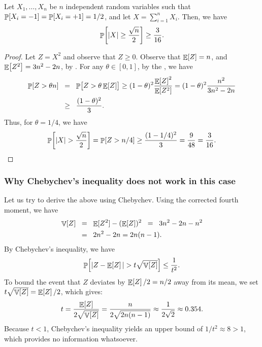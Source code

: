 \begin{lemma}
    Let $X_1, \ldots, X_n$ be $n$ independent random variables such
    that $\Prob{X_i=-1} = \Prob{X_i =+1} = 1/2$, and let
    $X = \sum_{i=1}^n X_i$. Then, we have
    \begin{align*}
      \Prob{\cardin{X} \geq \frac{\sqrt{n}}{2}}
      \geq%
      \frac{3}{16}.
    \end{align*}
\end{lemma}
\begin{proof}
    Let $Z = X^2$ and observe that $Z \geq 0$. Observe that
    $\mathop{\mathbb{E}}\!\left[ {Z} \right] = n$, and $\mathop{\mathbb{E}}\!\left[ {Z^2} \right] = 3n^2 - 2n$, by
    . For any $\theta \in [0,1]$, by
    the , we have
    \begin{align*}
        \Prob{ Z > \theta n}
        &\EQ%
        \Prob{Z > \theta \Ex{Z}\bigr.}
        \geq%
        (1-\theta)^2 \frac{\Ex{Z}^2}{\Ex{Z^2}}
        =
        (1-\theta)^2 \frac{n^2}{3n^2 - 2n}
        \\&
        \GEQ%
        \frac{(1-\theta)^2}{3}.
    \end{align*}
    Thus, for $\theta = 1/4$, we have
    \begin{equation*}
        \Prob{\cardin{X} > \frac{\sqrt{n}}{2}}
        =%
        \Prob{ Z > n/4}
        \geq
        \frac{(1-1/4)^2}{3}
        =
        \frac{9}{48}
        =
        \frac{3}{16}.
    \end{equation*}
\end{proof}


\subsubsection{Why Chebychev's inequality does not work in this case}

Let us try to derive the above using Chebychev.  
Using the corrected fourth moment, we have
\begin{align*}
    \Var{Z}
    &\EQ%
    \Ex{\smash{Z^2}} - (\Ex{Z})^2
    \EQ
    3n^2 - 2n - n^2
    \\&
    \EQ
    2n^2 - 2n = 2n(n-1).
\end{align*}
By Chebychev's inequality, we have
\begin{equation*}
    \Prob{ |Z - \Ex{Z}| > t \sqrt{\Var{Z}}} \leq \frac{1}{t^2}.
\end{equation*}
To bound the event that $Z$ deviates by $\mathop{\mathbb{E}}\!\left[ {Z} \right]/2 = n/2$ away from its mean, we set $t \sqrt{\mathop{\mathbb{V}}\!\left[ {Z} \right]} = \mathop{\mathbb{E}}\!\left[ {Z} \right]/2$, which gives:
\begin{equation*}
    t = \frac{\mathop{\mathbb{E}}\!\left[ {Z} \right]}{2\sqrt{\mathop{\mathbb{V}}\!\left[ {Z} \right]}} = \frac{n}{2\sqrt{2n(n-1)}} \approx \frac{1}{2\sqrt{2}} \approx 0.354.
\end{equation*}
Because $t < 1$, Chebychev's inequality yields an upper bound of
$1/t^2 \approx 8 > 1$, which provides no information whatsoever.

